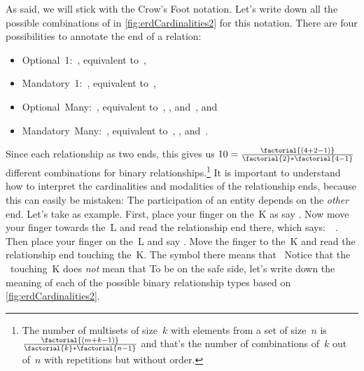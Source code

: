 As said, we will stick with the Crow's Foot notation.
Let's write down all the possible combinations of  in \cref{fig:erdCardinalities2} for this notation.
There are four possibilities to annotate the end of a relation:%
\begin{itemize}%
\item Optional~1:~\crowsFootOptionalOne, equivalent to~,%
\item Mandatory~1:~\crowsFootMandatoryOne, equivalent to~,%
\item Optional~Many:~\crowsFootOptionalMany, equivalent to~, , and~, and%
\item Mandatory~Many:~\crowsFootMandatoryMany, equivalent to~, , and~.%
\end{itemize}%
%
Since each relationship as two ends, this gives us $10=\frac{\factorial{(4+2-1)}}{\factorial{2}*\factorial{4-1}}$ different combinations for binary relationships.\footnote{%
The number of multisets of size~$k$ with elements from a set of size~$n$ is $\frac{\factorial{(m+k-1)}}{\factorial{k}*\factorial{n-1}}$ and that's the number of combinations of~$k$ out of~$n$ with repetitions but without order.%
} %
It is important to understand how to interpret the cardinalities and modalities of the relationship ends, because this can easily be mistaken:
The participation of an entity depends on the \emph{other} end.
Let's take  as example.
First, place your finger on the~K as say .
Now move your finger towards the~L and read the relationship end there, which says:~~\cite{SE:DA:2016HDIRENCFTCTNL}.
Then place your finger on the~L and say .
Move the finger to the~K and read the relationship end touching the~K.
The symbol there means that~
Notice that the \crowsFootMandatoryOne\ touching~K does \emph{not} mean that 
To be on the safe side, let's write down the meaning of each of the possible binary relationship types based on \cref{fig:erdCardinalities2}.%
%
